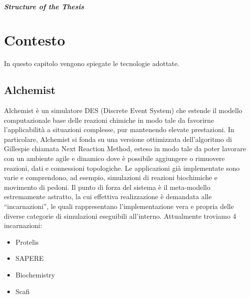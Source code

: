 \documentclass[12pt,a4paper,openright,twoside]{book}
\begin{document}
%
%
%

\paragraph{Structure of the Thesis}


\chapter{Contesto}
In questo capitolo vengono spiegate le tecnologie adottate. %

\section{Alchemist}
Alchemist\space\cite{Pianini_2013} è un simulatore DES (Discrete Event System) che estende il modello computazionale 
base delle reazioni chimiche in modo tale da favorirne l'applicabilità a situazioni complesse,
pur mantenendo elevate prestazioni. In particolare, Alchemist si fonda su una versione ottimizzata 
dell'algoritmo di Gillespie\cite{gillespie1977exact} chiamata Next Reaction Method\cite{gibson2000efficient}, esteso in modo tale da poter lavorare 
con un ambiente agile e dinamico dove è possibile aggiungere o rimuovere reazioni, dati e
connessioni topologiche. Le applicazioni già implementate sono varie e comprendono, ad esempio, 
simulazioni di reazioni biochimiche e movimento di pedoni. Il punto di forza del sistema è il 
meta-modello estremamente astratto, la cui effettiva realizzazione è demandata alle ``incarnazioni'',
le quali rappresentano l'implementazione vera e propria delle diverse categorie di simulazioni 
eseguibili all'interno. Attualmente troviamo 4 incarnazioni: 
\begin{itemize}
    \item Protelis
    \item SAPERE
    \item Biochemistry
    \item Scafi
\end{itemize}
\end{document}
